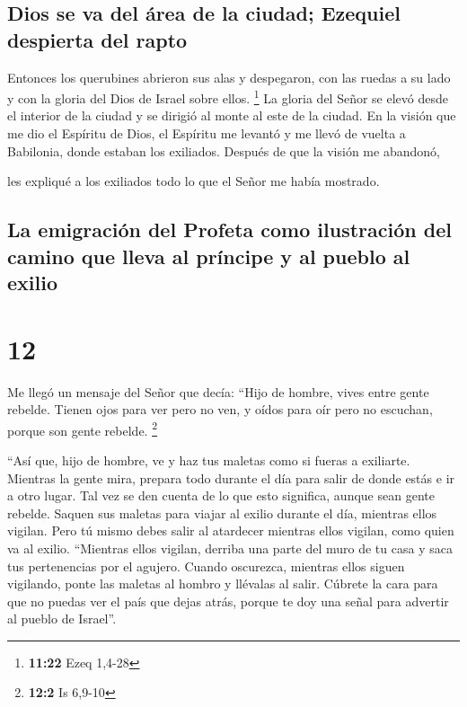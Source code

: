 \hypertarget{dios-se-va-del-uxe1rea-de-la-ciudad-ezequiel-despierta-del-rapto}{%
\subsection{Dios se va del área de la ciudad; Ezequiel despierta del
rapto}\label{dios-se-va-del-uxe1rea-de-la-ciudad-ezequiel-despierta-del-rapto}}

 Entonces los querubines abrieron sus alas y despegaron,
con las ruedas a su lado y con la gloria del Dios de Israel sobre ellos.
\footnote{\textbf{11:22} Ezeq 1,4-28}  La gloria del
Señor se elevó desde el interior de la ciudad y se dirigió al monte al
este de la ciudad.  En la visión que me dio el Espíritu
de Dios, el Espíritu me levantó y me llevó de vuelta a Babilonia, donde
estaban los exiliados. Después de que la visión me abandonó,

 les expliqué a los exiliados todo lo que el Señor me
había mostrado.

\hypertarget{la-emigraciuxf3n-del-profeta-como-ilustraciuxf3n-del-camino-que-lleva-al-pruxedncipe-y-al-pueblo-al-exilio}{%
\subsection{La emigración del Profeta como ilustración del camino que
lleva al príncipe y al pueblo al
exilio}\label{la-emigraciuxf3n-del-profeta-como-ilustraciuxf3n-del-camino-que-lleva-al-pruxedncipe-y-al-pueblo-al-exilio}}

\hypertarget{section-11}{%
\section{12}\label{section-11}}

 Me llegó un mensaje del Señor que decía: 
``Hijo de hombre, vives entre gente rebelde. Tienen ojos para ver pero
no ven, y oídos para oír pero no escuchan, porque son gente rebelde.
\footnote{\textbf{12:2} Is 6,9-10}

 ``Así que, hijo de hombre, ve y haz tus maletas como si
fueras a exiliarte. Mientras la gente mira, prepara todo durante el día
para salir de donde estás e ir a otro lugar. Tal vez se den cuenta de lo
que esto significa, aunque sean gente rebelde.  Saquen sus
maletas para viajar al exilio durante el día, mientras ellos vigilan.
Pero tú mismo debes salir al atardecer mientras ellos vigilan, como
quien va al exilio.  ``Mientras ellos vigilan, derriba una
parte del muro de tu casa y saca tus pertenencias por el agujero.
 Cuando oscurezca, mientras ellos siguen vigilando, ponte
las maletas al hombro y llévalas al salir. Cúbrete la cara para que no
puedas ver el país que dejas atrás, porque te doy una señal para
advertir al pueblo de Israel''.

